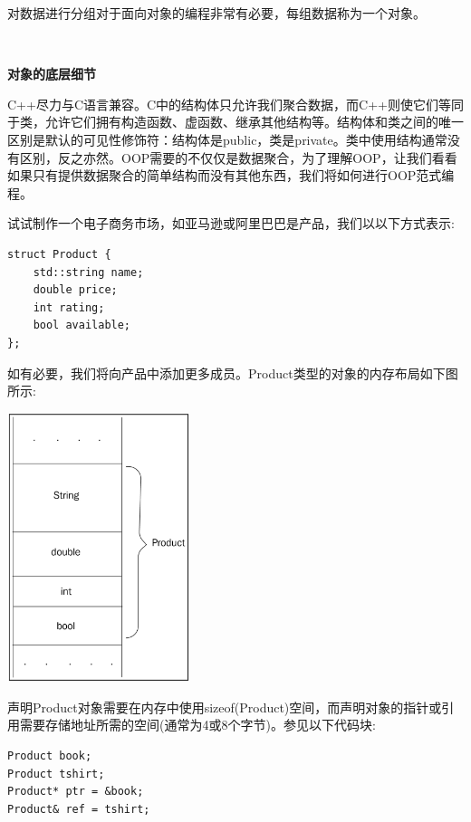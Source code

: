 对数据进行分组对于面向对象的编程非常有必要，每组数据称为一个对象。 \par

\noindent\textbf{}\ \par
\textbf{对象的底层细节} \ \par
C++尽力与C语言兼容。C中的结构体只允许我们聚合数据，而C++则使它们等同于类，允许它们拥有构造函数、虚函数、继承其他结构等。结构体和类之间的唯一区别是默认的可见性修饰符：结构体是public，类是private。类中使用结构通常没有区别，反之亦然。OOP需要的不仅仅是数据聚合，为了理解OOP，让我们看看如果只有提供数据聚合的简单结构而没有其他东西，我们将如何进行OOP范式编程。 \par
试试制作一个电子商务市场，如亚马逊或阿里巴巴是产品，我们以以下方式表示: \par

\begin{lstlisting}[caption={}]
struct Product {
	std::string name;
	double price;
	int rating;
	bool available;
};
\end{lstlisting}

如有必要，我们将向产品中添加更多成员。Product类型的对象的内存布局如下图所示: \par

\begin{center}
	\includegraphics[width=0.4\textwidth]{content/Section-1/Chapter-3/1}
\end{center}

声明Product对象需要在内存中使用sizeof(Product)空间，而声明对象的指针或引用需要存储地址所需的空间(通常为4或8个字节)。参见以下代码块:\par

\begin{lstlisting}[caption={}]
Product book;
Product tshirt;
Product* ptr = &book;
Product& ref = tshirt;
\end{lstlisting}

